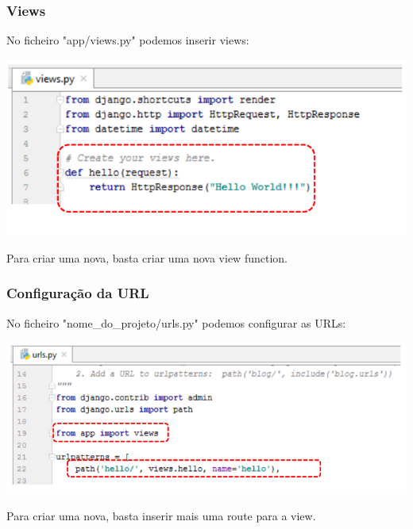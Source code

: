 \documentclass{article}
\begin{document}
\subsubsection{Views}

\begin{flushleft}
  No ficheiro "app/views.py"  podemos inserir views:
\end{flushleft}

\begin{center}
  \includegraphics[scale=0.3]{10}
\end{center}

\begin{flushleft}
  Para criar uma nova, basta criar uma nova view function.
\end{flushleft}

\subsubsection{Configuração da URL}

\begin{flushleft}
  No ficheiro "nome\_do\_projeto/urls.py" podemos configurar as URLs:
\end{flushleft}

\begin{center}
  \includegraphics[scale=0.3]{11}
\end{center}

\begin{flushleft}
  Para criar uma nova, basta inserir mais uma route para a view.
\end{flushleft}
\end{document}
